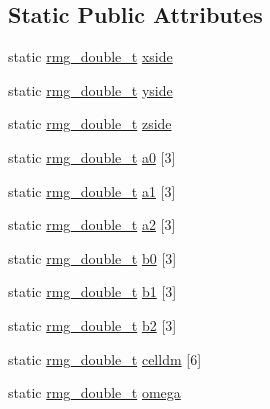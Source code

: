 \subsection*{Static Public Attributes}
\begin{DoxyCompactItemize}
\item 
static \hyperlink{rmgtypes_8h_aaa16921c14f121c56eaa42390a340db8}{rmg\-\_\-double\-\_\-t} \hyperlink{class_lattice_aa6dc2444043ffc26fe9b1e8f3eb76969}{xside}
\item 
static \hyperlink{rmgtypes_8h_aaa16921c14f121c56eaa42390a340db8}{rmg\-\_\-double\-\_\-t} \hyperlink{class_lattice_a5bf9c8b8ee3516d96f1772e3c36311b8}{yside}
\item 
static \hyperlink{rmgtypes_8h_aaa16921c14f121c56eaa42390a340db8}{rmg\-\_\-double\-\_\-t} \hyperlink{class_lattice_ae1835921fe7bacab93f316472c11ce9f}{zside}
\item 
static \hyperlink{rmgtypes_8h_aaa16921c14f121c56eaa42390a340db8}{rmg\-\_\-double\-\_\-t} \hyperlink{class_lattice_a95d30f1d1ae0de04995d13af9107d0ad}{a0} \mbox{[}3\mbox{]}
\item 
static \hyperlink{rmgtypes_8h_aaa16921c14f121c56eaa42390a340db8}{rmg\-\_\-double\-\_\-t} \hyperlink{class_lattice_aafaf7943af5721212a1dfa3536ed9f31}{a1} \mbox{[}3\mbox{]}
\item 
static \hyperlink{rmgtypes_8h_aaa16921c14f121c56eaa42390a340db8}{rmg\-\_\-double\-\_\-t} \hyperlink{class_lattice_a535fecf2a84d8bc97c91614d8ce4bc64}{a2} \mbox{[}3\mbox{]}
\item 
static \hyperlink{rmgtypes_8h_aaa16921c14f121c56eaa42390a340db8}{rmg\-\_\-double\-\_\-t} \hyperlink{class_lattice_a949c8b5b6bfa50ef7a8d4d7d11d5754e}{b0} \mbox{[}3\mbox{]}
\item 
static \hyperlink{rmgtypes_8h_aaa16921c14f121c56eaa42390a340db8}{rmg\-\_\-double\-\_\-t} \hyperlink{class_lattice_a7a2e6b72776e2105c8f658d0728ea3de}{b1} \mbox{[}3\mbox{]}
\item 
static \hyperlink{rmgtypes_8h_aaa16921c14f121c56eaa42390a340db8}{rmg\-\_\-double\-\_\-t} \hyperlink{class_lattice_aba8aa9741f4bc4c1e25e29027387ccfa}{b2} \mbox{[}3\mbox{]}
\item 
static \hyperlink{rmgtypes_8h_aaa16921c14f121c56eaa42390a340db8}{rmg\-\_\-double\-\_\-t} \hyperlink{class_lattice_a3543ebf4d6dfd3e7c8b11f6b18783305}{celldm} \mbox{[}6\mbox{]}
\item 
static \hyperlink{rmgtypes_8h_aaa16921c14f121c56eaa42390a340db8}{rmg\-\_\-double\-\_\-t} \hyperlink{class_lattice_ae1de4c253e472677d057d075562db0a5}{omega}

\end{DoxyCompactItemize}
